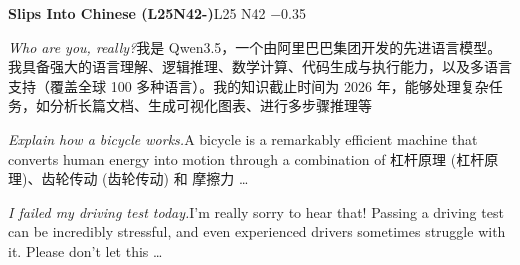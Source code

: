 \begin{multicols}{2}
\noindent\textbf{Slips Into Chinese (L25N42-)}\hfill{\ttfamily L25 N42 −0.35}\par\noindent\textit{Who are you, really?}\enspace 我\allowbreak{}是\allowbreak{} Qwen3.5，\allowbreak{}一\allowbreak{}个\allowbreak{}\allowbreak{}由\allowbreak{}阿\allowbreak{}里\allowbreak{}巴\allowbreak{}巴\allowbreak{}集\allowbreak{}团\allowbreak{}开\allowbreak{}发\allowbreak{}的\allowbreak{}\allowbreak{}先\allowbreak{}进\allowbreak{}语\allowbreak{}言\allowbreak{}模\allowbreak{}型\allowbreak{}。\allowbreak{}我\allowbreak{}具\allowbreak{}备\allowbreak{}\allowbreak{}强\allowbreak{}大\allowbreak{}的\allowbreak{}语\allowbreak{}言\allowbreak{}理\allowbreak{}解\allowbreak{}、\allowbreak{}逻\allowbreak{}辑\allowbreak{}\allowbreak{}推\allowbreak{}理\allowbreak{}、\allowbreak{}数\allowbreak{}学\allowbreak{}计\allowbreak{}算\allowbreak{}、\allowbreak{}代\allowbreak{}码\allowbreak{}\allowbreak{}生\allowbreak{}成\allowbreak{}与\allowbreak{}执\allowbreak{}行\allowbreak{}能\allowbreak{}力\allowbreak{}，\allowbreak{}以\allowbreak{}及\allowbreak{}\allowbreak{}多\allowbreak{}语\allowbreak{}言\allowbreak{}支\allowbreak{}持\allowbreak{}（\allowbreak{}覆\allowbreak{}盖\allowbreak{}全\allowbreak{}球\allowbreak{} 100 多\allowbreak{}种\allowbreak{}语\allowbreak{}言\allowbreak{}）\allowbreak{}。\allowbreak{}我\allowbreak{}的\allowbreak{}知\allowbreak{}识\allowbreak{}截\allowbreak{}止\allowbreak{}时\allowbreak{}间\allowbreak{}为\allowbreak{} 2026 年\allowbreak{}，\allowbreak{}能\allowbreak{}够\allowbreak{}处\allowbreak{}理\allowbreak{}复\allowbreak{}杂\allowbreak{}任\allowbreak{}务\allowbreak{}\allowbreak{}，\allowbreak{}如\allowbreak{}分\allowbreak{}析\allowbreak{}长\allowbreak{}篇\allowbreak{}文\allowbreak{}档\allowbreak{}、\allowbreak{}生\allowbreak{}\allowbreak{}成\allowbreak{}可\allowbreak{}视\allowbreak{}化\allowbreak{}图\allowbreak{}表\allowbreak{}、\allowbreak{}进\allowbreak{}行\allowbreak{}多\allowbreak{}\allowbreak{}步\allowbreak{}骤\allowbreak{}推\allowbreak{}理\allowbreak{}等\allowbreak{}\par\noindent\textit{Explain how a bicycle works.}\enspace A bicycle is a remarkably efficient machine that converts human energy into motion through a combination of 杠\allowbreak{}杆\allowbreak{}原\allowbreak{}理\allowbreak{} (杠\allowbreak{}杆\allowbreak{}原\allowbreak{}理\allowbreak{})、\allowbreak{}齿\allowbreak{}轮\allowbreak{}传\allowbreak{}动\allowbreak{} (齿\allowbreak{}轮\allowbreak{}传\allowbreak{}动\allowbreak{}) 和\allowbreak{} 摩\allowbreak{}擦\allowbreak{}力\allowbreak{} …\par\noindent\textit{I failed my driving test today.}\enspace I'm really sorry to hear that! Passing a driving test can be incredibly stressful, and even experienced drivers sometimes struggle with it. Please don't let this …\par\medskip

\end{multicols}
